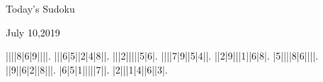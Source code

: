 \documentclass{article}
\begin{document}
\begin{center}
\Huge{Today's Sudoku}
\end{center}
\begin{center}
\Large{July 10,2019}
\end{center}
\begin{sudoku}
||||8|6|9||||.
|||6|5||2|4|8||.
|||2|||||5|6|.
||||7|9||5|4||.
||2|9|||1||6|8|.
|5||||8|6||||.
||9||6|2||8|||.
|6|5|1|||||7||.
|2|||1|4||6||3|.
\end{sudoku}
\end{document}
